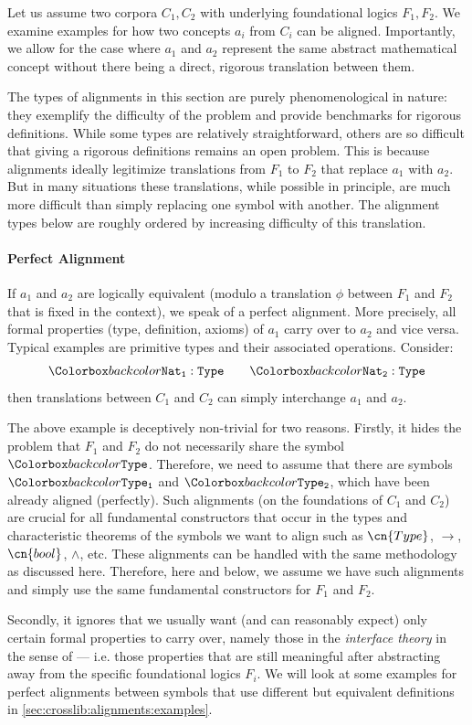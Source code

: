 Let us assume two corpora $C_1,C_2$ with underlying foundational logics $F_1,F_2$.  We
examine examples for how two concepts $a_i$ from $C_i$ can be aligned.
Importantly, we allow for the case where $a_1$ and $a_2$ represent the same abstract mathematical concept without there being a direct, rigorous translation between them.

The types of alignments in this section are purely phenomenological in nature:
they exemplify the difficulty of the problem and provide benchmarks for rigorous definitions.
While some types are relatively straightforward, others are so difficult that giving a rigorous definitions remains an open problem.
This is because alignments ideally legitimize translations from $F_1$ to $F_2$ that replace $a_1$ with $a_2$.
But in many situations these translations, while possible in principle, are much more difficult than simply replacing one symbol with another.
The alignment types below are roughly ordered by increasing difficulty of this translation.

\paragraph{Perfect Alignment}
If $a_1$ and $a_2$ are logically equivalent (modulo a translation $\phi$ between
  $F_1$ and $F_2$ that is fixed in the context), we speak of a perfect alignment.  More
precisely, all formal properties (type, definition, axioms) of $a_1$ carry over to $a_2$
and vice versa.
%
Typical examples are primitive types and their associated operations. Consider:
\[\expr{Nat_1:Type}\qquad \expr{Nat_2 :Type}\]
then translations between $C_1$ and $C_2$ can simply interchange $a_1$ and $a_2$.

The above example is deceptively non-trivial for two reasons.  Firstly, it hides the problem
that $F_1$ and $F_2$ do not necessarily share the symbol $\expr{Type}$.  Therefore, we need
to assume that there are symbols $\expr{Type_1}$ and $\expr{Type_2}$, which have been already
aligned (perfectly).  Such alignments (on the foundations of $C_1$ and $C_2$) are crucial for all fundamental constructors that
occur in the types and characteristic theorems of the symbols we want to align such as
$\cn{Type}$, $\to$, $\cn{bool}$, $\wedge$, etc.  These alignments can be handled with the
same methodology as discussed here.  Therefore, here and below, we assume we have such
alignments and simply use the same fundamental constructors for $F_1$ and $F_2$.

Secondly, it ignores that we usually want (and can reasonably expect) only certain formal
properties to carry over, namely those in the \emph{interface theory} in the sense of
\cite{KR:qed:14} --- i.e. those properties that are still meaningful after abstracting away from the specific foundational logics $F_i$.
We will look at some examples for perfect alignments between symbols that use different but equivalent definitions in \autoref{sec:crosslib:alignments:examples}.

